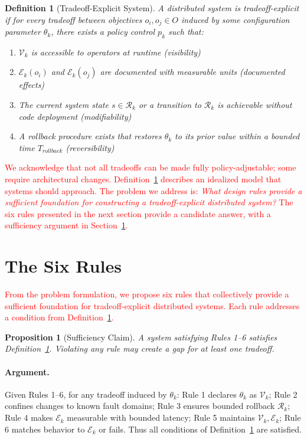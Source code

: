 \documentclass[conference]{IEEEtran}
\newtheorem{definition}[theorem]{Definition}
\newtheorem{proposition}[theorem]{Proposition}
\begin{document}
{\color{red}
\begin{definition}[Tradeoff-Explicit System]
\label{def:te}
A distributed system is \textit{tradeoff-explicit} if for every tradeoff between objectives $o_i, o_j \in O$ induced by some configuration parameter $\theta_k$, there exists a policy control $p_k$ such that:
\begin{enumerate}
    \item $\mathcal{V}_k$ is accessible to operators at runtime (visibility)
    \item $\mathcal{E}_k(o_i)$ and $\mathcal{E}_k(o_j)$ are documented with measurable units (documented effects)
    \item The current system state $s \in \mathcal{R}_k$ or a transition to $\mathcal{R}_k$ is achievable without code deployment (modifiability)
    \item A rollback procedure exists that restores $\theta_k$ to its prior value within a bounded time $T_{rollback}$ (reversibility)
\end{enumerate}
\end{definition}}

\textcolor{red}{
We acknowledge that not all tradeoffs can be made fully policy-adjustable; some require architectural changes. Definition~\ref{def:te} describes an idealized model that systems should approach. The problem we address is: \textit{What design rules provide a sufficient foundation for constructing a tradeoff-explicit distributed system?} The six rules presented in the next section provide a candidate answer, with a sufficiency argument in Section~\ref{sec:rules}.}

\section{The Six Rules}
\label{sec:rules}

\textcolor{red}{
From the problem formulation, we propose six rules that collectively provide a sufficient foundation for tradeoff-explicit distributed systems. Each rule addresses a condition from Definition~\ref{def:te}.}

{\color{red}
\begin{proposition}[Sufficiency Claim]
\label{thm:rules_complete}
A system satisfying Rules 1--6 satisfies Definition~\ref{def:te}. Violating any rule may create a gap for at least one tradeoff.
\end{proposition}}

{\color{red}
\paragraph{Argument.}
Given Rules 1--6, for any tradeoff induced by $\theta_k$: Rule 1 declares $\theta_k$ as $\mathcal{V}_k$; Rule 2 confines changes to known fault domains; Rule 3 ensures bounded rollback $\mathcal{R}_k$; Rule 4 makes $\mathcal{E}_k$ measurable with bounded latency; Rule 5 maintains $\mathcal{V}_k,\mathcal{E}_k$; Rule 6 matches behavior to $\mathcal{E}_k$ or fails. Thus all conditions of Definition~\ref{def:te} are satisfied.}
\end{document}
